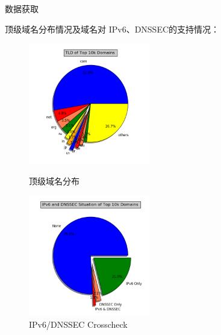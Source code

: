 \documentclass{beamer}
\begin{document}
\begin{frame}{数据获取}

  顶级域名分布情况及域名对 IPv6、DNSSEC的支持情况：

  \begin{figure}[htbp]
    \centering
    \begin{minipage}[htbp]{150pt}
      \centering
      \includegraphics[width=150pt]{images/figure/figure_2.png}
      \caption{\scriptsize{顶级域名分布}}
      \label{fig:4}
    \end{minipage}
    \hspace{10pt}%
    \begin{minipage}[htpb]{150pt}
      \centering
      \includegraphics[width=150pt]{images/figure/figure_3.png}
      \caption{\scriptsize{IPv6/DNSSEC Crosscheck}}
      \label{fig:5}
    \end{minipage}
    \end{figure}


\end{frame}
\end{document}
